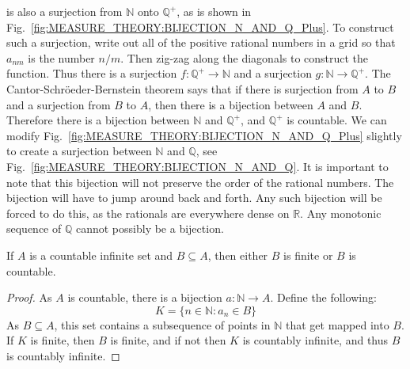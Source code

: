             is also a surjection from $\mathbb{N}$ onto
            $\mathbb{Q}^{+}$, as is shown in
            Fig.~\ref{fig:MEASURE_THEORY:BIJECTION_N_AND_Q_Plus}.
            \newpage
            To construct such a surjection, write out all of the
            positive rational numbers in a grid so that $a_{nm}$ is
            the number $n/m$. Then zig-zag along the diagonals
            to construct the function. Thus there is a surjection
            $f:\mathbb{Q}^{+}\rightarrow\mathbb{N}$
            and a surjection $g:\mathbb{N}\rightarrow\mathbb{Q}^{+}$. The
            Cantor-Schr\"{o}eder-Bernstein theorem says that if there
            is surjection from $A$ to $B$ and a surjection from $B$
            to $A$, then there is a bijection between $A$ and $B$.
            Therefore there is a bijection between $\mathbb{N}$ and
            $\mathbb{Q}^{+}$, and $\mathbb{Q}^{+}$ is countable.
            We can modify
            Fig.~\ref{fig:MEASURE_THEORY:BIJECTION_N_AND_Q_Plus}
            slightly to create a surjection between $\mathbb{N}$ and
            $\mathbb{Q}$, see
            Fig.~\ref{fig:MEASURE_THEORY:BIJECTION_N_AND_Q}.
            It is important to note that this bijection will not
            preserve the order of the rational numbers. The bijection
            will have to jump around back and forth. Any such
            bijection will be forced to do this, as the rationals are
            everywhere dense on $\mathbb{R}$. Any monotonic sequence of
            $\mathbb{Q}$ cannot possibly be a bijection.
            \begin{theorem}
                If $A$ is a countable infinite set and
                $B\subseteq{A}$, then either $B$ is finite or
                $B$ is countable.
            \end{theorem}
            \begin{proof}
                As $A$ is countable, there is a bijection
                $a:\mathbb{N}\rightarrow{A}$. Define the following:
                \begin{equation}
                    K=\{n\in\mathbb{N}:a_{n}\in{B}\}
                \end{equation}
                As $B\subseteq{A}$,
                this set contains a subsequence of points in
                $\mathbb{N}$ that get mapped into $B$. If $K$ is finite,
                then $B$ is finite, and if not then $K$ is countably
                infinite, and thus $B$ is countably infinite.
            \end{proof}
